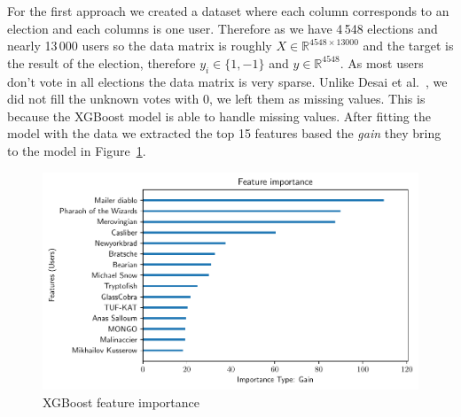 For the first approach we created a dataset where each column corresponds to an election and each columns is one user. Therefore as we have 4\,548 elections and nearly 13\,000 users so the data matrix is roughly $X\in \mathbb{R}^{4548\times 13000}$ and the target is the result of the election, therefore $y_i\in \{1,-1\}$ and $y\in \mathbb{R}^{4548}$. As most users don't vote in all elections the data matrix is very sparse. Unlike Desai et al.\ \cite{desai2014result}, we did not fill the unknown votes with 0, we left them as missing values. This is because the XGBoost model is able to handle missing values. After fitting the model with the data we extracted the top 15 features based the \textit{gain} they bring to the model in Figure~\ref{fig:xgboost-feat-importance}. 
\begin{figure}[!ht]
    \centering
    \includegraphics[width=\linewidth]{images/xgboost_features.pdf}
    \caption{XGBoost feature importance}
    \label{fig:xgboost-feat-importance}
\end{figure}

